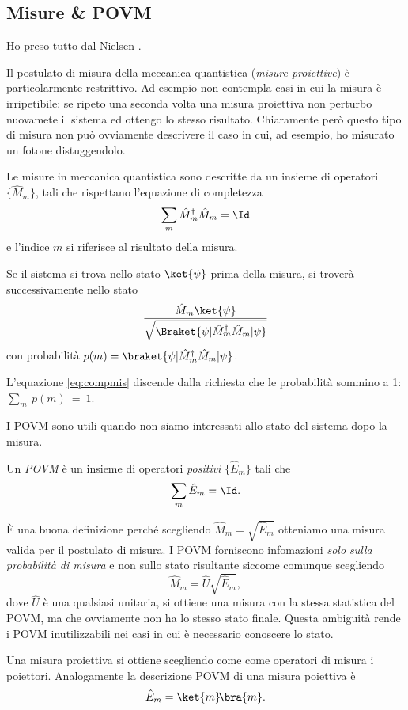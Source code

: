 \documentclass[a4]{article}
\begin{document}
\subsection{Misure \& POVM}
Ho preso tutto dal Nielsen \cite{nielsen2010quantum}.

Il postulato di misura della meccanica quantistica (\emph{misure proiettive}) è particolarmente
restrittivo. Ad esempio non contempla casi in cui la misura è irripetibile: se ripeto una
seconda volta una misura proiettiva non perturbo nuovamete il sistema ed ottengo lo stesso
risultato. Chiaramente però questo tipo di misura non può ovviamente descrivere il caso in
cui, ad esempio, ho misurato un fotone distuggendolo.
\begin{post}[di misura]
Le misure in meccanica quantistica sono descritte da un insieme di operatori
\(\{\hat{M}_m\}\), tali che rispettano l'equazione di completezza
\begin{equation} \label{eq:compmis}
\sum_m \hat{M}^\dag_m \hat{M}_m = \Id
\end{equation}
e l'indice \(m\) si riferisce al risultato della misura.

Se il sistema si trova nello stato \(\ket{\psi}\) prima della misura, si troverà successivamente
nello stato
\[ \frac{\hat{M}_m \ket{\psi}}{\sqrt{\Braket{\psi|\hat{M}^\dag_m \hat{M}_m|\psi}}}\]
con probabilità \(p(m)= \braket{\psi|\hat{M}^\dag_m \hat{M}_m|\psi}\).
\end{post}
L'equazione \eqref{eq:compmis} discende dalla richiesta che le probabilità sommino a 1:
\(\sum_m~p(m)~=~1\).

I POVM sono utili quando non siamo interessati allo stato del sistema dopo la misura.
\begin{defn}[POVM]
Un \emph{POVM} è un insieme di operatori \emph{positivi} \(\{\hat{E}_m\}\) tali che
\[\sum_m \hat{E}_m  = \Id.\]
\end{defn}
È una buona definizione perché scegliendo \(\hat{M}_m = \sqrt{\hat{E}_m}\) otteniamo una
misura valida per il postulato di misura. I POVM forniscono infomazioni \emph{solo sulla
probabilità di misura} e non sullo stato risultante siccome comunque scegliendo
\[\hat{M}_m = \hat{U}\sqrt{\hat{E}_m},\]
dove \(\hat{U}\) è una qualsiasi unitaria, si ottiene una misura con la stessa statistica
del POVM, ma che ovviamente non ha lo stesso stato finale. Questa ambiguità
rende i POVM inutilizzabili nei casi in cui è necessario conoscere lo stato.

Una misura proiettiva si ottiene scegliendo come come operatori di misura
i poiettori. Analogamente la descrizione POVM di una misura poiettiva è
\[\hat{E}_m = \ket{m}\!\bra{m}.\]
\end{document}
